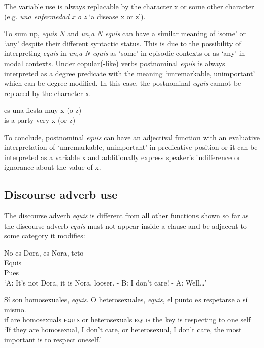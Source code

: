 \documentclass[output=paper]{langsci/langscibook}
\begin{document}
The variable use is always replacable by the character x or some other character (e.g. \textit{una enfermedad x o z} ‘a disease x or z’).

To sum up, \textit{equis N} and \textit{un,a N equis} can have a similar meaning of ‘some’ or ‘any’ despite their different syntactic status. This is due to the possibility of interpreting \textit{equis} in \textit{un,a N equis} as ‘some’ in episodic contexts or as ‘any’ in modal contexts. Under copular(-like) verbs postnominal \textit{equis} is always interpreted as a degree predicate with the meaning ‘unremarkable, unimportant’ which can be degree modified. In this case, the postnominal \textit{equis} cannot be replaced by the character x.

\ea\label{ex:kellert:27}
\gll {*} es una fiesta muy x (o z)\\
{} is a party very x (or z)\\
\z

To conclude, postnominal \textit{equis} can have an adjectival function with an evaluative interpretation of ‘unremarkable, unimportant’ in predicative position or it can be interpreted as a variable x and additionally express speaker’s indifference or ignorance about the value of x.

\subsection{Discourse adverb use}\label{sec:kellert:2.4}
The discourse adverb \textit{equis} is different from all other functions shown so far as the discourse adverb \textit{equis} must not appear inside a clause and be adjacent to some category it modifies:

\ea\label{ex:kellert:28}
\begin{xlist}
 No es Dora, es Nora, teto\\
 Equis\\
 Pues\\
\glt ‘A: It’s not Dora, it is Nora, looser. - B: I don’t care! - A: Well…’
\end{xlist}
\z

\ea\label{ex:kellert:29}
\gll Sí son homosexuales, \textit{equis}. O heterosexuales, \textit{equis}, el punto es respetarse a sí mismo.\\
if are homosexuals \textsc{equis} or heterosexuals \textsc{equis} the key is respecting to one self\\
\glt ‘If they are homosexual, I don’t care, or heterosexual, I don’t care, the most important is to respect oneself.’
\z
\end{document}
